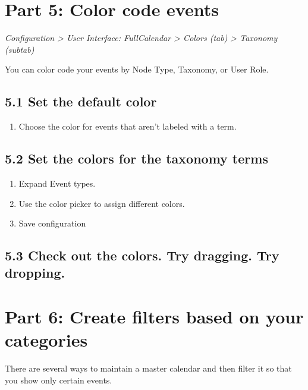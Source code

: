 \documentclass[letterpaper,10pt,english]{sphinxmanual}
\begin{document}
\section{Part 5: Color code events}
\label{event_calendar:part-5-color-code-events}
\emph{Configuration \textgreater{} User Interface: FullCalendar \textgreater{} Colors (tab) \textgreater{} Taxonomy (subtab)}

You can color code your events by Node Type, Taxonomy, or User Role.


\subsection{5.1 Set the default color}
\label{event_calendar:set-the-default-color}\begin{enumerate}
\item {} 
Choose the color for events that aren't labeled with a term.

\end{enumerate}


\subsection{5.2 Set the colors for the taxonomy terms}
\label{event_calendar:set-the-colors-for-the-taxonomy-terms}\begin{enumerate}
\item {} 
Expand Event types.

\item {} 
Use the color picker to assign different colors.

\item {} 
Save configuration

\end{enumerate}


\subsection{5.3 Check out the colors. Try dragging. Try dropping.}
\label{event_calendar:check-out-the-colors-try-dragging-try-dropping}

\section{Part 6: Create filters based on your categories}
\label{event_calendar:part-6-create-filters-based-on-your-categories}
There are several ways to maintain a master calendar and then filter it so that you show only certain events.
\end{document}
